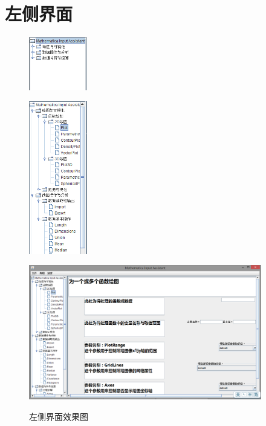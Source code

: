 \documentclass[hyperref, UTF8
,bookmarksnumbered=true, oneside]{ctexbook}
\begin{document}


	\section{左侧界面} %

		\begin{figure}[!h]
			\begin{minipage}[b]{0.15\textwidth}
			\centering
			\includegraphics[width=1in]{Left1.png}
			\label{pic:MathPack}
			\end{minipage}%
			\hspace{0.025\textwidth}%
			\begin{minipage}[b]{0.15\textwidth}
			\centering
			\includegraphics[width=1in]{Left2.png}
			\label{pic:GUIPack}
			\end{minipage}			
			\hspace{0.025\textwidth}%
			\begin{minipage}[b]{0.6\textwidth}
			\centering
			\includegraphics[width=4in]{Left3.png}
			\label{pic:GUIPack}
			\end{minipage}
			\caption{左侧界面效果图}
		\end{figure}
\end{document}
